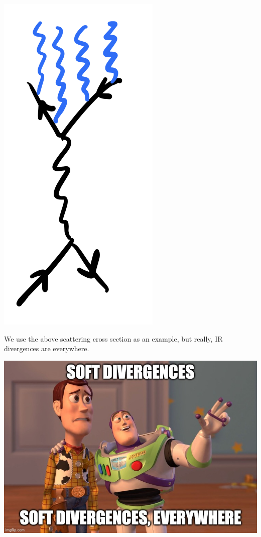 \begin{center}
    \includegraphics[scale=0.35]{Lectures/Images/lec14-multisoft.png}
\end{center}

We use the above scattering cross section as an example, but really, IR divergences are everywhere.

\begin{center}
    \includegraphics[scale=0.35]{Lectures/Images/lec14-everywhere.jpg}
\end{center}

